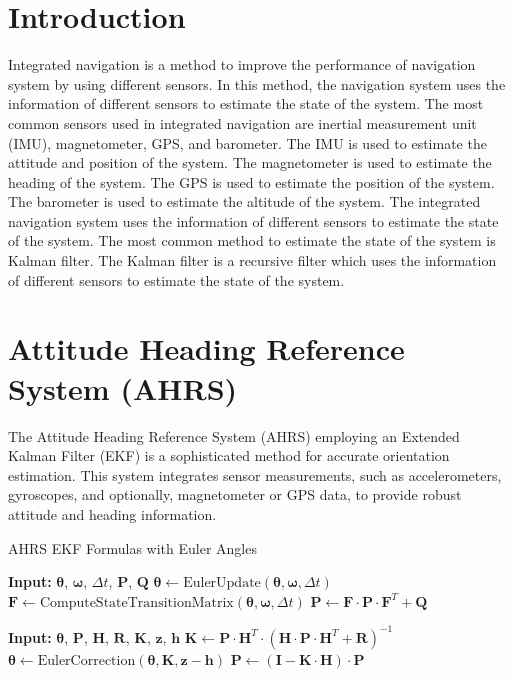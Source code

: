 \documentclass[conference]{IEEEtran}
\begin{document}
\section{Introduction}
    Integrated navigation is a method to improve the performance of navigation system by using different sensors. In this method, the navigation system uses the information of different sensors to estimate the state of the system. The most common sensors used in integrated navigation are inertial measurement unit (IMU), magnetometer, GPS, and barometer. The IMU is used to estimate the attitude and position of the system. The magnetometer is used to estimate the heading of the system. The GPS is used to estimate the position of the system. The barometer is used to estimate the altitude of the system. The integrated navigation system uses the information of different sensors to estimate the state of the system. The most common method to estimate the state of the system is Kalman filter. The Kalman filter is a recursive filter which uses the information of different sensors to estimate the state of the system.



    \section{Attitude Heading Reference System (AHRS)}

    The Attitude Heading Reference System (AHRS) employing an Extended Kalman Filter (EKF) is a sophisticated method for accurate orientation estimation. This system integrates sensor measurements, such as accelerometers, gyroscopes, and optionally, magnetometer or GPS data, to provide robust attitude and heading information.
    \begin{algorithm}
        \caption{AHRS EKF Formulas with Euler Angles}
        \begin{algorithmic}[1]
            \State \textbf{Input:} $\boldsymbol{\theta}$, $\boldsymbol{\omega}$, $\Delta t$, $\mathbf{P}$, $\mathbf{Q}$
            \State $\boldsymbol{\theta} \gets \text{EulerUpdate}(\boldsymbol{\theta}, \boldsymbol{\omega}, \Delta t)$
            \State $\mathbf{F} \gets \text{ComputeStateTransitionMatrix}(\boldsymbol{\theta}, \boldsymbol{\omega}, \Delta t)$
            \State $\mathbf{P} \gets \mathbf{F} \cdot \mathbf{P} \cdot \mathbf{F}^T + \mathbf{Q}$
          \EndProcedure
      
            \State \textbf{Input:} $\boldsymbol{\theta}$, $\mathbf{P}$, $\mathbf{H}$, $\mathbf{R}$, $\mathbf{K}$, $\mathbf{z}$, $\mathbf{h}$
            \State $\mathbf{K} \gets \mathbf{P} \cdot \mathbf{H}^T \cdot (\mathbf{H} \cdot \mathbf{P} \cdot \mathbf{H}^T + \mathbf{R})^{-1}$
            \State $\boldsymbol{\theta} \gets \text{EulerCorrection}(\boldsymbol{\theta}, \mathbf{K}, \mathbf{z} - \mathbf{h})$
            \State $\mathbf{P} \gets (\mathbf{I} - \mathbf{K} \cdot \mathbf{H}) \cdot \mathbf{P}$
          \EndProcedure
        \end{algorithmic}
    \end{algorithm}
\end{document}
